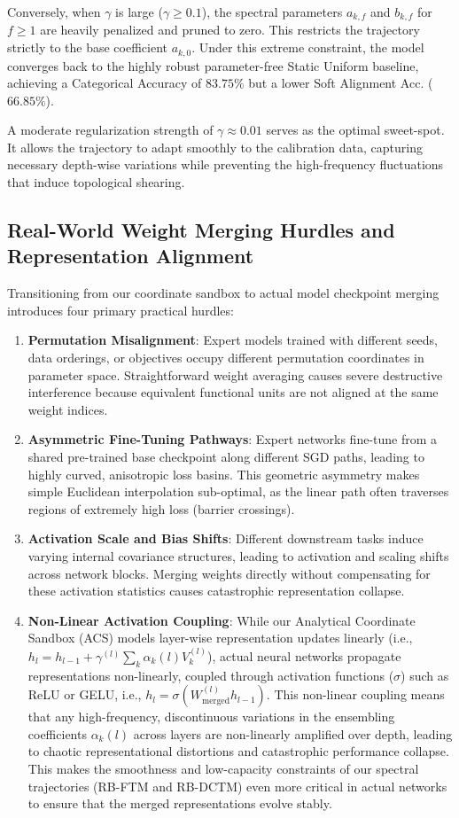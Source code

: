 Conversely, when $\gamma$ is large ($\gamma \ge 0.1$), the spectral parameters $a_{k,f}$ and $b_{k,f}$ for $f \ge 1$ are heavily penalized and pruned to zero. This restricts the trajectory strictly to the base coefficient $a_{k,0}$. Under this extreme constraint, the model converges back to the highly robust parameter-free Static Uniform baseline, achieving a Categorical Accuracy of $83.75\%$ but a lower Soft Alignment Acc. ($66.85\%$). 

A moderate regularization strength of $\gamma \approx 0.01$ serves as the optimal sweet-spot. It allows the trajectory to adapt smoothly to the calibration data, capturing necessary depth-wise variations while preventing the high-frequency fluctuations that induce topological shearing.


\subsection{Real-World Weight Merging Hurdles and Representation Alignment}
\label{sec:appendix_real_world_hurdles}
Transitioning from our coordinate sandbox to actual model checkpoint merging introduces four primary practical hurdles:
\begin{enumerate}
    \item \textbf{Permutation Misalignment}: Expert models trained with different seeds, data orderings, or objectives occupy different permutation coordinates in parameter space. Straightforward weight averaging causes severe destructive interference because equivalent functional units are not aligned at the same weight indices.
    \item \textbf{Asymmetric Fine-Tuning Pathways}: Expert networks fine-tune from a shared pre-trained base checkpoint along different SGD paths, leading to highly curved, anisotropic loss basins. This geometric asymmetry makes simple Euclidean interpolation sub-optimal, as the linear path often traverses regions of extremely high loss (barrier crossings).
     \item \textbf{Activation Scale and Bias Shifts}: Different downstream tasks induce varying internal covariance structures, leading to activation and scaling shifts across network blocks. Merging weights directly without compensating for these activation statistics causes catastrophic representation collapse.
    \item \textbf{Non-Linear Activation Coupling}: While our Analytical Coordinate Sandbox (ACS) models layer-wise representation updates linearly (i.e., $h_l = h_{l-1} + \gamma^{(l)} \sum_k \alpha_k(l) V_k^{(l)}$), actual neural networks propagate representations non-linearly, coupled through activation functions ($\sigma$) such as ReLU or GELU, i.e., $h_l = \sigma(W_{\text{merged}}^{(l)} h_{l-1})$. This non-linear coupling means that any high-frequency, discontinuous variations in the ensembling coefficients $\alpha_k(l)$ across layers are non-linearly amplified over depth, leading to chaotic representational distortions and catastrophic performance collapse. This makes the smoothness and low-capacity constraints of our spectral trajectories (RB-FTM and RB-DCTM) even more critical in actual networks to ensure that the merged representations evolve stably.
\end{enumerate}

